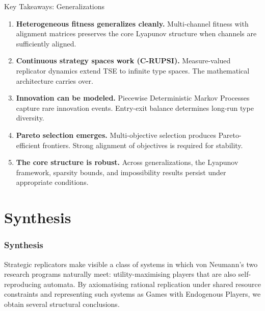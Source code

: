 \documentclass[12pt]{article}
\begin{document}
\begin{takeawaybox}{Key Takeaways: Generalizations}
\begin{enumerate}
    \item \textbf{Heterogeneous fitness generalizes cleanly.} Multi-channel fitness with alignment matrices preserves the core Lyapunov structure when channels are sufficiently aligned.
    
    \item \textbf{Continuous strategy spaces work (C-RUPSI).} Measure-valued replicator dynamics extend TSE to infinite type spaces. The mathematical architecture carries over.
    
    \item \textbf{Innovation can be modeled.} Piecewise Deterministic Markov Processes capture rare innovation events. Entry-exit balance determines long-run type diversity.
    
    \item \textbf{Pareto selection emerges.} Multi-objective selection produces Pareto-efficient frontiers. Strong alignment of objectives is required for stability.
    
    \item \textbf{The core structure is robust.} Across generalizations, the Lyapunov framework, sparsity bounds, and impossibility results persist under appropriate conditions.
\end{enumerate}
\end{takeawaybox}




\part{Synthesis}

\section{Synthesis}
\label{sec:synthesis}

Strategic replicators make visible a class of systems in which von Neumann's two research programs naturally meet: utility-maximising players that are also self-reproducing automata. By axiomatising rational replication under shared resource constraints and representing such systems as Games with Endogenous Players, we obtain several structural conclusions.
\end{document}
